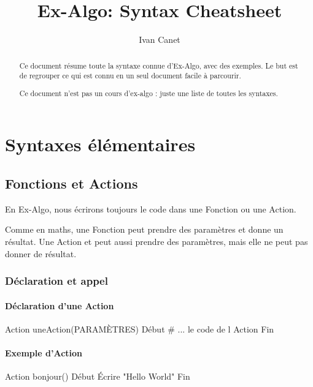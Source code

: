 \documentclass[10pt,a4paper,french]{article}
\begin{document}

\title{Ex-Algo: Syntax Cheatsheet}
\author{Ivan Canet}
\maketitle

\begin{abstract}
Ce document résume toute la syntaxe connue d'Ex-Algo, avec des exemples. Le but est de regrouper ce qui est connu en un seul document facile à parcourir.

Ce document n'est pas un cours d'ex-algo : juste une liste de toutes les syntaxes.
\end{abstract}
\tableofcontents

\section{Syntaxes élémentaires}

\subsection{Fonctions et Actions}

En Ex-Algo, nous écrirons toujours le code dans une Fonction ou une Action.

Comme en maths, une Fonction peut prendre des paramètres et donne un résultat. Une Action et peut aussi prendre des paramètres, mais elle ne peut pas donner de résultat.

\subsubsection{Déclaration et appel}

\paragraph{Déclaration d'une Action}
\begin{exalgo}
Action uneAction(PARAMÈTRES)
Début
	# ... le code de l Action
Fin
\end{exalgo}

\paragraph{Exemple d'Action}
\begin{exalgo}
Action bonjour()
Début
	Écrire "Hello World"
Fin
\end{exalgo}
\end{document}
